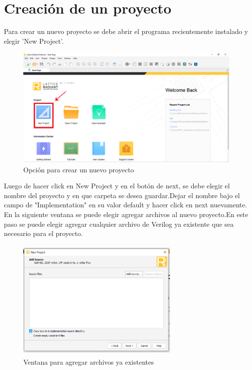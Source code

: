 \documentclass{article}
\begin{document}
\section{Creación de un proyecto}
	Para crear un nuevo proyecto se debe abrir el programa recientemente instalado y elegir 'New Project'.
	\begin{figure}[H]
	\centering
	\includegraphics[height=6cm,width=0.7\linewidth]{Imagenes/NewProj.png}
	\caption{Opción para crear un nuevo proyecto}
	\end{figure}
	
	Luego de hacer click en New Project y en el botón de next, se debe elegir el nombre del proyecto y en que carpeta se desea guardar.Dejar el nombre bajo el campo de "Implementation" en su valor default y hacer click en next nuevamente.
	En la siguiente ventana se puede elegir agregar archivos al nuevo proyecto.En este paso se puede elegir agregar cualquier archivo de Verilog ya existente que sea necesario para el proyecto.
	\begin{figure}[H]
	\centering
	\includegraphics[height=6cm,width=8cm]{Imagenes/AddSources.png}
	\caption{Ventana para agregar archivos ya existentes}
	\end{figure}
	
\end{document}
